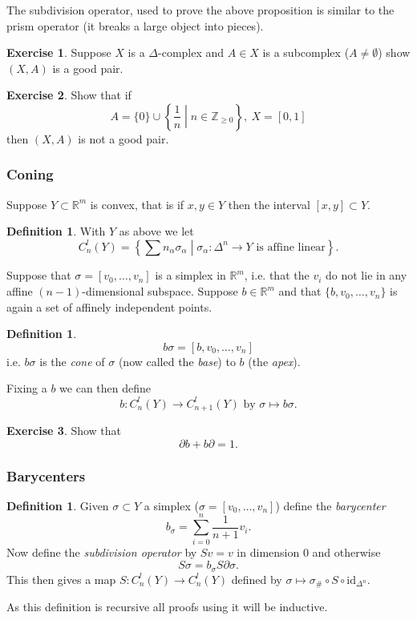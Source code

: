 \documentclass[12pt]{article}
\theoremstyle{definition}
\theoremstyle{definition}
\newtheorem{defn}[thm]{Definition}
\newtheorem*{exer}{Exercise}
\newcommand{\ZZ}{\mathbb{Z}}
\newcommand{\RR}{\mathbb{R}}
\begin{document}
The subdivision operator, used to prove the above proposition is similar to the prism operator (it breaks a large object into pieces).

\begin{exer}
Suppose $X$ is a $\Delta$-complex and $A\in X$ is a subcomplex ($A\ne \emptyset$) show $(X,A)$ is a good pair.
\end{exer}

\begin{exer}
Show that if
\[
A = \{0\} \cup \left\{\frac{1}{n}\middle| n \in \ZZ_{\ge 0} \right\},\ X=[0,1]
\]
then $(X,A)$ is not a good pair.
\end{exer}

\subsubsection{Coning}
Suppose $Y\subset \RR^m$ is convex, that is if $x,y\in Y$ then the interval $[x,y]\subset Y$.

\begin{defn}
With $Y$ as above we let
\[
C_n^l(Y) =\left\{ \sum n_\alpha \sigma_\alpha \middle| \sigma_\alpha \colon \Delta^n \to Y \text{ is affine linear}\right\}.
\]
\end{defn}

Suppose that $\sigma = [v_0,\ldots,v_n]$ is a simplex in $\RR^m$, i.e. that the $v_i$ do not lie in any affine $(n-1)$-dimensional subspace.
Suppose $b\in \RR^m$ and that $\{b,v_0,\ldots,v_n\}$ is again a set of affinely independent points.

\begin{defn}
\[
b\sigma = [b,v_0,\ldots,v_n]
\]
i.e. $b\sigma$ is the \emph{cone} of $\sigma$ (now called the \emph{base}) to $b$ (the \emph{apex}).

Fixing a $b$ we can then define
\[
b\colon C_n^l (Y) \to C_{n+1}^l(Y)
\text{ by }
\sigma \mapsto b\sigma.
\]
\end{defn}

\begin{exer}
Show that
\[
\partial b + b\partial = 1.
\]
\end{exer}

\subsubsection{Barycenters}
\begin{defn}
Given $\sigma \subset Y$ a simplex ($\sigma = [v_0,\ldots,v_n]$) define the \emph{barycenter}
\[
b_\sigma = \sum_{i=0}^{n} \frac{1}{n+1}v_i.
\]
Now define the \emph{subdivision operator} by $Sv = v$ in dimension 0 and otherwise
\[
S\sigma = b_\sigma S\partial \sigma.
\]
This then gives a map $S\colon C_n^l(Y) \to C_n^l(Y)$ defined by $\sigma \mapsto \sigma_\#\circ S\circ \text{id}_{\Delta^n}$.
\end{defn}
As this definition is recursive all proofs using it will be inductive.
\end{document}
